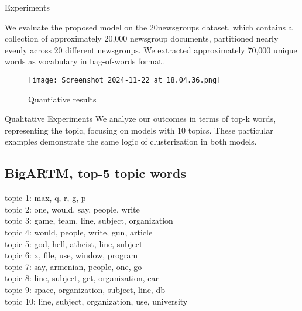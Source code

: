\documentclass[10pt,pdf,hyperref={unicode}]{beamer}
\begin{document}
\begin{frame}{Experiments}

We evaluate the proposed model on the 20newsgroups dataset, which contains a collection of approximately 20,000 newsgroup documents, partitioned nearly evenly across 20 different newsgroups. We extracted approximately 70,000 unique words as vocabulary in bag-of-words format.

    \begin{figure}
    \centering
    \texttt{[image: Screenshot 2024-11-22 at 18.04.36.png]}
    \caption{Quantiative results}
    \label{fig:enter-label1}
\end{figure}
\end{frame}

\begin{frame}{Qualitative Experiments}
    We analyze our outcomes in terms of top-k words, representing the topic, focusing on models with 10 topics. These particular examples demonstrate the same logic of clusterization in both models.\\

\begin{multicols}{2}
\section*{BigARTM, top-5 topic words}
topic 1: max, q, r, g, p\\
topic 2: one, would, say, people, write\\
topic 3: game, team, line, subject, organization\\
topic 4: would, people, write, gun, article\\
topic 5: god, hell, atheist, line, subject\\
topic 6: x, file, use, window, program\\
topic 7: say, armenian, people, one, go\\
topic 8: line, subject, get, organization, car\\
topic 9: space, organization, subject, line, db\\
topic 10: line, subject, organization, use, university\\

\columnbreak


\end{multicols}
\end{frame}
\end{document}
